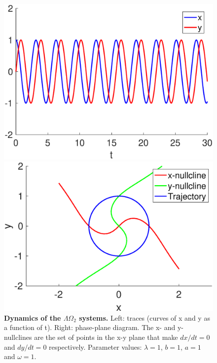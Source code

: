 \begin{figure}[h]
  \begin{minipage}{0.45\linewidth}
  \begin{center}
\includegraphics[width=1\linewidth]{Images/photo7_1.eps}
\end{center}
  \end{minipage} 
  \begin{minipage}{0.45\linewidth}
  \begin{center}
\includegraphics[width=1\linewidth]{Images/photo7_2.eps}
\end{center}
  \end{minipage} 
  \caption{\textbf{Dynamics of the $\Lambda \Omega_{2}$ systems.} Left: traces (curves of x and y as a function of t). Right: phase-plane diagram. The x- and y- nullclines are the set of points in the x-y plane that make $dx/dt=0$ and $dy/dt=0$ respectively. Parameter values: $\lambda = 1$, $b=1$, $a = 1$ and $\omega = 1$.}
  \label{photo7}
\end{figure}

